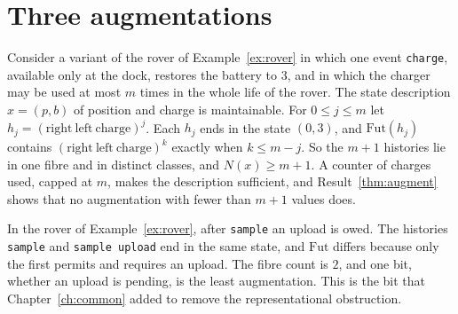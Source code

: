 \section{Three augmentations}

\begin{example}\label{ex:charger}
Consider a variant of the rover of Example~\ref{ex:rover} in which one event \texttt{charge}, available only at the dock, restores the battery to $3$, and in which the charger may be used at most $m$ times in the whole life of the rover. The state description $x=(p,b)$ of position and charge is maintainable. For $0\le j\le m$ let $h_j=(\mathrm{right}\ \mathrm{left}\ \mathrm{charge})^{j}$. Each $h_j$ ends in the state $(0,3)$, and $\mathrm{Fut}(h_j)$ contains $(\mathrm{right}\ \mathrm{left}\ \mathrm{charge})^{k}$ exactly when $k\le m-j$. So the $m+1$ histories lie in one fibre and in distinct classes, and $N(x)\ge m+1$. A counter of charges used, capped at $m$, makes the description sufficient, and Result~\ref{thm:augment} shows that no augmentation with fewer than $m+1$ values does.
\end{example}

\begin{example}\label{ex:pending}
In the rover of Example~\ref{ex:rover}, after \texttt{sample} an upload is owed. The histories \texttt{sample} and \texttt{sample upload} end in the same state, and $\mathrm{Fut}$ differs because only the first permits and requires an upload. The fibre count is $2$, and one bit, whether an upload is pending, is the least augmentation. This is the bit that Chapter~\ref{ch:common} added to remove the representational obstruction.
\end{example}

